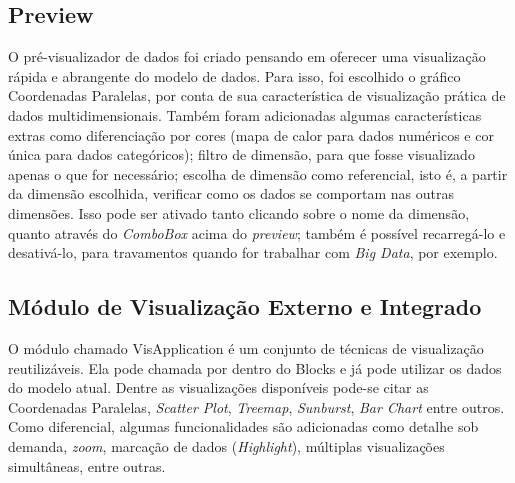 \documentclass[
	12pt,				%
	openright,			%
	oneside,			%
	a4paper,			%
	english,			%
	brazil				%
	]{abntex2}
\begin{document}
		\subsection{Preview}
			O pré-visualizador de dados foi criado pensando em oferecer uma visualização rápida e abrangente do modelo de dados.
			Para isso, foi escolhido o gráfico Coordenadas Paralelas, por conta de sua característica de visualização prática de dados multidimensionais.
			Também foram adicionadas algumas características extras como diferenciação por cores (mapa de calor para dados numéricos e cor única para dados categóricos); 
				filtro de dimensão, para que fosse visualizado apenas o que for necessário;
				escolha de dimensão como referencial, isto é, a partir da dimensão escolhida, verificar como os dados se comportam nas outras dimensões. Isso pode ser ativado tanto clicando sobre o nome da dimensão, quanto através do \emph{ComboBox} acima do \emph{preview};
				também é possível recarregá-lo e desativá-lo, para travamentos quando for trabalhar com \emph{Big Data}, por exemplo.

		\subsection{Módulo de Visualização Externo e Integrado}
			O módulo chamado VisApplication é um conjunto de técnicas de visualização reutilizáveis.
			Ela pode chamada por dentro do Blocks e já pode utilizar os dados do modelo atual.
			Dentre as visualizações disponíveis pode-se citar as Coordenadas Paralelas, \emph{Scatter Plot}, \emph{Treemap}, \emph{Sunburst}, \emph{Bar Chart} entre outros.
			Como diferencial, algumas funcionalidades são adicionadas como detalhe sob demanda, \emph{zoom}, marcação de dados (\emph{Highlight}), múltiplas visualizações simultâneas, entre outras.
	
\end{document}
